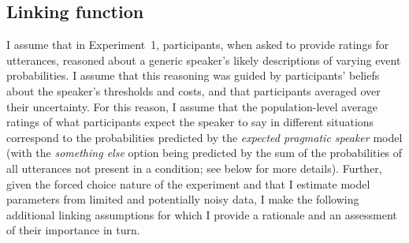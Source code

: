\subsection{Linking function}

I assume that in Experiment~1, participants, when asked to provide ratings for utterances, reasoned about a generic speaker's 
likely descriptions of varying event probabilities. 
I assume that this reasoning was guided by participants' beliefs about the speaker's thresholds and costs, and 
that participants averaged over their uncertainty. For this reason, I assume that the population-level 
average ratings of what participants expect the speaker to say in different situations 
correspond to the probabilities predicted by the \textit{expected pragmatic speaker} model (with the \textit{something else}
option being predicted by the sum of the probabilities of all utterances not present in a condition; see below for more details).
Further, given the forced choice nature of the experiment and that I estimate model 
parameters from limited and potentially noisy data, I make the following additional linking assumptions
for which I provide a rationale and an assessment of their importance in turn.


